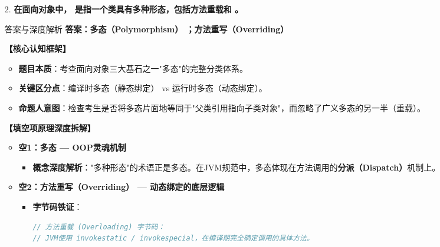 \documentclass[12pt, a4paper]{ctexart}
\begin{document}
\begin{enumerate}[label=\textbf{\arabic*.}]
	\item[2.] \textbf{在面向对象中，\underline{\hspace{4cm}} 是指一个类具有多种形态，包括方法重载和 \underline{\hspace{4cm}}。}

	      \begin{bluebox}{答案与深度解析}
		      \textbf{答案：多态（Polymorphism） \quad ；\quad 方法重写（Overriding）}

		      \textbf{【核心认知框架】}
		      \begin{itemize}[leftmargin=*, nosep]
			      \item \textbf{题目本质}：考查面向对象三大基石之一"多态"的完整分类体系。
			      \item \textbf{关键区分点}：编译时多态（静态绑定） vs 运行时多态（动态绑定）。
			      \item \textbf{命题人意图}：检查考生是否将多态片面地等同于"父类引用指向子类对象"，而忽略了广义多态的另一半（重载）。
		      \end{itemize}

		      \textbf{【填空项原理深度拆解】}

		      \begin{itemize}[leftmargin=*]
			      \item \textbf{空1：多态 — OOP灵魂机制}
			            \begin{itemize}[leftmargin=*, nosep]
				            \item \textbf{概念深度解析}："多种形态"的术语正是多态。在JVM规范中，多态体现在方法调用的\textbf{分派（Dispatch）}机制上。
			            \end{itemize}

			      \item \textbf{空2：方法重写（Overriding） — 动态绑定的底层逻辑}
			            \begin{itemize}[leftmargin=*, nosep]
				            \item \textbf{字节码铁证}：
				                  \begin{lstlisting}[language=Java]
// 方法重载 (Overloading) 字节码：
// JVM使用 invokestatic / invokespecial，在编译期完全确定调用的具体方法。


\end{lstlisting}
\end{itemize}
\end{itemize}
\end{bluebox}
\end{enumerate}
\end{document}
